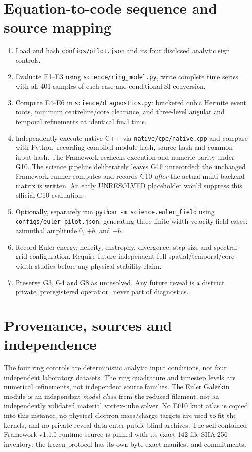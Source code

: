 \documentclass[10pt,a4paper]{article}
\begin{document}
\section{Equation-to-code sequence and source mapping}
\begin{enumerate}
\item Load and hash \texttt{configs/pilot.json} and its four disclosed analytic sign controls.
\item Evaluate E1--E3 using \texttt{science/ring\_model.py}, write complete time series with all 401 samples of each case and conditional SI conversion.
\item Compute E4--E6 in \texttt{science/diagnostics.py}: bracketed cubic Hermite event roots, minimum centreline/core clearance, and three-level angular and temporal refinements at identical final time.
\item Independently execute native C++ via \texttt{native/cpp/native.cpp} and compare with Python, recording compiled module hash, source hash and common input hash. The Framework rechecks execution and numeric parity under G10. The science pipeline deliberately leaves G10 unrecorded; the unchanged Framework runner computes and records G10 \emph{after} the actual multi-backend matrix is written. An early UNRESOLVED placeholder would suppress this official G10 evaluation.
\item Optionally, separately run \texttt{python -m science.euler\_field} using \texttt{configs/euler\_pilot.json}, generating three finite-width velocity-field cases: azimuthal amplitude $0$, $+b$, and $-b$.
\item Record Euler energy, helicity, enstrophy, divergence, step size and spectral-grid configuration. Require future independent full spatial/temporal/core-width studies before any physical stability claim.
\item Preserve G3, G4 and G8 as unresolved. Any future reveal is a distinct private, preregistered operation, never part of diagnostics.
\end{enumerate}

\section{Provenance, sources and independence}
The four ring controls are deterministic analytic input conditions, not four independent laboratory datasets. The ring quadrature and timestep levels are numerical refinements, not independent source families. The Euler Galerkin module is an independent \emph{model class} from the reduced filament, not an independently validated material vortex-tube solver. No E010 knot atlas is copied into this instance, no physical electron mass/charge targets are used to fit the kernels, and no private reveal data enter public blind archives. The self-contained Framework v1.1.0 runtime source is pinned with its exact 142-file SHA-256 inventory; the frozen protocol has its own byte-exact manifest and commitments.
\end{document}
